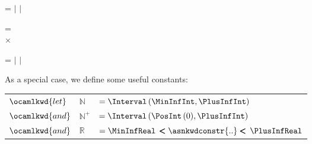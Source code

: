 \begin{Def}[Expressions]
\noindent
{}  =
\ocamlconstr{[} 
$\mid$ \MinInfReal{} 
$\mid$ \PlusInfReal \ocamlconstr{]}

\noindent
{}  =\\
\hspace*{2mm}
\ocamlconstr{[}\Interval{}  
$\times$ \ocamlconstr{]}

\noindent
{}  =
\ocamlconstr{[} 
$\mid$ \MinInfInt{}
$\mid$ \PlusInfInt \ocamlconstr{]}

\smallskip

\noindent
As a special case, we define some useful constants:

\noindent
\begin{tabular}{lll}
    $\ocamlkwd{let}$ 
  & \hspace*{-4mm}
    $\mathbb{N}$ 
  & \hspace*{-5mm}
    $= \Interval \, (\MinInfInt, \PlusInfInt)$\\
    $\ocamlkwd{and}$
  & \hspace*{-4mm}
    $\mathbb{N}^{+}$
  & \hspace*{-5mm}
    $= \Interval \, (\PosInt \, (0), \PlusInfInt)$\\
    $\ocamlkwd{and}$
  & \hspace*{-4mm}
    $\mathbb{R}$
  & \hspace*{-5mm}
    $= \MinInfReal \, \pmb{<} \asnkwdconstr{..} \pmb{<} \,
     \PlusInfReal$ 
\end{tabular}


\end{Def}
